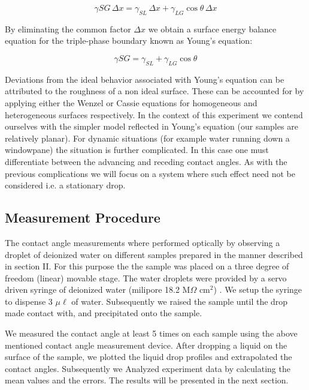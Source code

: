 \begin{equation}
\gamma{SG} \, \Delta x = \gamma_{SL} \, \Delta x + \gamma_{LG} \cos{\theta}\, \Delta x
\end{equation}

By eliminating the common factor $\Delta x$ we obtain a surface energy balance equation for the triple-phase boundary known as Young's equation:

\begin{equation}
\gamma{SG} = \gamma_{SL} + \gamma_{LG} \cos{\theta}
\end{equation}

Deviations from the ideal behavior associated with Young's equation can be attributed to the roughness of a non ideal surface. These can be accounted for by applying either the Wenzel or Cassie equations for homogeneous and heterogeneous surfaces respectively. In the context of this experiment we contend ourselves with the simpler model reflected in Young's equation (our samples are relatively planar).
For dynamic situations (for example water running down a windowpane) the situation is further complicated. In this case one must differentiate between the advancing and receding contact angles. As with the previous complications we will focus on a system where such effect need not be considered i.e. a stationary drop.

\subsection{Measurement Procedure}

The contact angle measurements where performed optically by observing a droplet of deionized water on different samples prepared in the manner described in section II. For this purpose the the sample was placed on a three degree of freedom (linear) movable stage. The water droplets were provided by a servo driven syringe of deionized water (milipore 18.2 M$\Omega$ cm$^{2}$) . 
We setup the syringe to dispense 3 $\mu \ell$ of water. Subsequently we raised the sample until the drop made contact with, and precipitated onto the sample. 

We measured the contact angle at least 5 times on each sample using the above mentioned contact angle measurement device. After dropping a liquid on the surface of the sample, we plotted the liquid drop profiles and extrapolated the contact angles. Subsequently we Analyzed experiment data by calculating the mean values and the errors. The results will be presented in the next section.

